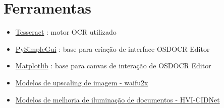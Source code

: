 \chapter{Ferramentas}

\begin{itemize}
	\item \href{https://github.com/tesseract-ocr/tesseract}{Tesseract} : motor OCR utilizado
	
	\item \href{https://www.pysimplegui.com}{PySimpleGui} : base para criação de interface OSDOCR Editor
	
	\item \href{https://matplotlib.org}{Matplotlib} : base para canvas de interação de OSDOCR Editor
	
	\item \href{https://github.com/nagadomi/waifu2x}{Modelos de upscaling de imagem - waifu2x}
	
	\item \href{https://github.com/Fediory/HVI-CIDNet}{Modelos de melhoria de iluminação de documentos - HVI-CIDNet}
	
\end{itemize}